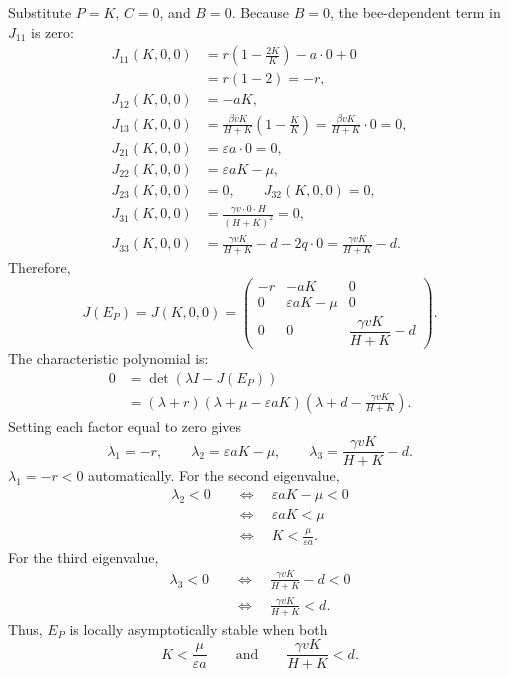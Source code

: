 \documentclass[11pt]{article}
\begin{document}
Substitute $P=K$, $C=0$, and $B=0$. Because $B=0$, the bee-dependent term
in $J_{11}$ is zero:
\begin{align*}
    J_{11}(K,0,0)
        &= r\left(1-\frac{2K}{K}\right)-a\cdot 0+0 \\
        &= r(1-2)=-r, \\
    J_{12}(K,0,0) &= -aK, \\
    J_{13}(K,0,0)
        &= \frac{\beta vK}{H+K}\left(1-\frac{K}{K}\right)
         =\frac{\beta vK}{H+K}\cdot 0=0, \\
    J_{21}(K,0,0) &= \varepsilon a\cdot 0=0, \\
    J_{22}(K,0,0) &= \varepsilon aK-\mu, \\
    J_{23}(K,0,0) &= 0,\qquad J_{32}(K,0,0)=0, \\
    J_{31}(K,0,0) &= \frac{\gamma v\cdot 0\cdot H}{(H+K)^2}=0, \\
    J_{33}(K,0,0) &= \frac{\gamma vK}{H+K}-d-2q\cdot 0
         =\frac{\gamma vK}{H+K}-d.
\end{align*}
Therefore,
\[
    J(E_P)=J(K,0,0)=
    \begin{pmatrix}
        -r & -aK & 0 \\[6pt]
        0 & \varepsilon aK-\mu & 0 \\[6pt]
        0 & 0 & \dfrac{\gamma vK}{H+K}-d
    \end{pmatrix}.
\]
The characteristic polynomial is:
\begin{align*}
    0 &= \det(\lambda I-J(E_P)) \\
      &= (\lambda+r)(\lambda+\mu-\varepsilon aK)
         \left(\lambda+d-\frac{\gamma vK}{H+K}\right).
\end{align*}
Setting each factor equal to zero gives
\[
    \lambda_1=-r,\qquad
    \lambda_2=\varepsilon aK-\mu,\qquad
    \lambda_3=\frac{\gamma vK}{H+K}-d.
\]
 $\lambda_1=-r<0$ automatically.
For the second eigenvalue,
\begin{align*}
    \lambda_2<0
    &\quad\Longleftrightarrow\quad \varepsilon aK-\mu<0 \\
    &\quad\Longleftrightarrow\quad \varepsilon aK<\mu \\
    &\quad\Longleftrightarrow\quad K<\frac{\mu}{\varepsilon a}.
\end{align*}
For the third eigenvalue,
\begin{align*}
    \lambda_3<0
    &\quad\Longleftrightarrow\quad \frac{\gamma vK}{H+K}-d<0 \\
    &\quad\Longleftrightarrow\quad \frac{\gamma vK}{H+K}<d.
\end{align*}
Thus, $E_P$ is locally asymptotically stable when both
\[
    K<\frac{\mu}{\varepsilon a}
    \qquad\text{and}\qquad
    \frac{\gamma vK}{H+K}<d.
\]
\end{document}
